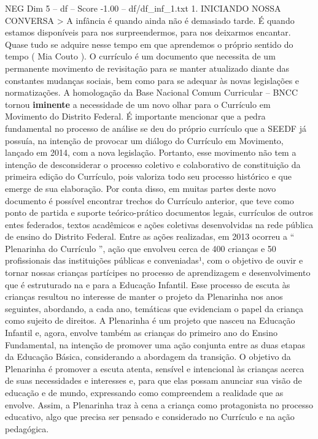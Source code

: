 \begin{textsample}{NEG Dim 5 – df – Score -1.00 – df/df\_inf\_1.txt}  \label{ex:f5_neg_136}
1.
INICIANDO NOSSA CONVERSA > A infância é quando ainda não é demasiado tarde.
É quando estamos disponíveis para nos surpreendermos, para nos deixarmos encantar.
Quase tudo se adquire nesse tempo em que aprendemos o próprio sentido do tempo ( Mia Couto ).
O currículo é um documento que necessita de um permanente movimento de revisitação para se manter atualizado diante das constantes mudanças sociais, bem como para se adequar às novas legislações e normatizações.
A homologação da Base Nacional Comum Curricular – BNCC tornou \textbf{iminente} a necessidade de um novo olhar para o Currículo em Movimento do Distrito Federal.
É importante mencionar que a pedra fundamental no processo de análise se deu do próprio currículo que a SEEDF já possuía, na intenção de provocar um diálogo do Currículo em Movimento, lançado em 2014, com a nova legislação.
Portanto, esse movimento não tem a intenção de desconsiderar o processo coletivo e colaborativo de constituição da primeira edição do Currículo, pois valoriza todo seu processo histórico e que emerge de sua elaboração.
Por conta disso, em muitas partes deste novo documento é possível encontrar trechos do Currículo anterior, que teve como ponto de partida e suporte teórico-prático documentos legais, currículos de outros entes federados, textos acadêmicos e ações coletivas desenvolvidas na rede pública de ensino do Distrito Federal.
Entre as ações realizadas, em 2013 ocorreu a “ Plenarinha do Currículo ”, ação que envolveu cerca de 400 crianças e 50 profissionais das instituições públicas e conveniadas¹, com o objetivo de ouvir e tornar nossas crianças partícipes no processo de aprendizagem e desenvolvimento que é estruturado na e para a Educação Infantil.
Esse processo de escuta às crianças resultou no interesse de manter o projeto da Plenarinha nos anos seguintes, abordando, a cada ano, temáticas que evidenciam o papel da criança como sujeito de direitos.
A Plenarinha é um projeto que nasceu na Educação Infantil e, agora, envolve também as crianças do primeiro ano do Ensino Fundamental, na intenção de promover uma ação conjunta entre as duas etapas da Educação Básica, considerando a abordagem da transição.
O objetivo da Plenarinha é promover a escuta atenta, sensível e intencional às crianças acerca de suas necessidades e interesses e, para que elas possam anunciar sua visão de educação e de mundo, expressando como compreendem a realidade que as envolve.
Assim, a Plenarinha traz à cena a criança como protagonista no processo educativo, algo que precisa ser pensado e considerado no Currículo e na ação pedagógica.

\end{textsample}
